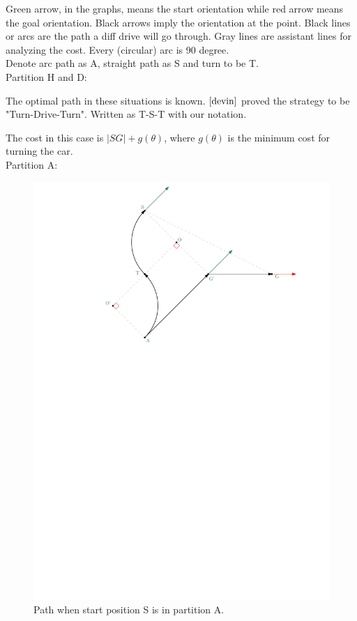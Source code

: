 \documentclass[12pt]{article}
\begin{document}
  Green arrow, in the graphs, means the start orientation while red arrow means the goal orientation. Black arrows imply the orientation at the point. Black lines or arcs are the path a diff drive will go through. Gray lines are assistant lines for analyzing the cost.  Every (circular) arc is 90 degree.\\
  
  Denote arc path as A, straight path as S and turn to be T. \\  
  
  Partition H and D:
  
  The optimal path in these situations is known. $\cite{devin}$ proved the strategy to be "Turn-Drive-Turn". Written as T-S-T with our notation. 
  
  The cost in this case is $|SG|+g(\theta)$, where $g(\theta)$ is the minimum cost for turning the car. 
  \\
  
  Partition A:
  
  \begin{figure}
  \centering
  \includegraphics[scale=0.65]{Diff_Drive_Gene_Case_4}
  \caption{Path when start position S is in partition A. }
  \end{figure}
  
\end{document}

